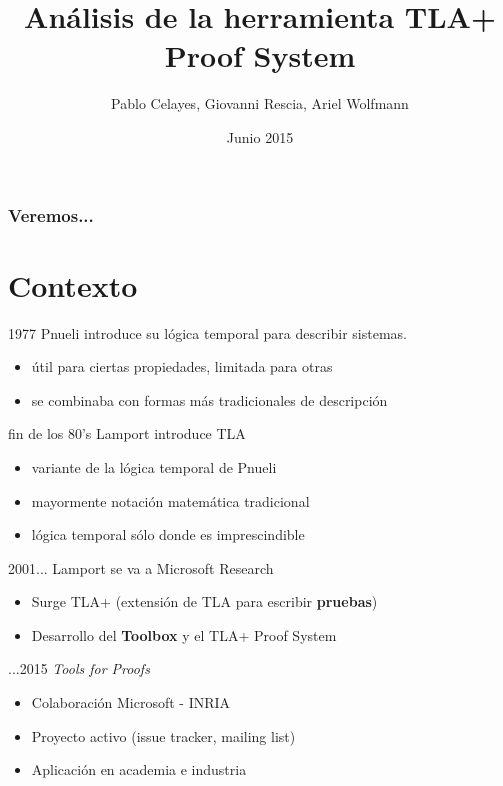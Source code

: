 \documentclass[12pt]{beamer}
\title{Análisis de la herramienta TLA+ Proof System}
\author{Pablo Celayes, Giovanni Rescia, Ariel Wolfmann}
\institute{Facultad de Matemática, Astronomía y Física\\
Universidad Nacional de Córdoba}
\date{Junio 2015}
\newenvironment{stepitemize}{\begin{itemize}[<+->]}{\end{itemize} }
\begin{document}
\begin{frame}
  \titlepage
\end{frame}

\begin{frame}
  \frametitle{Veremos...}
  \tableofcontents[pausesections]
\end{frame}


\section{Contexto}
\begin{frame}{1977}
  Pnueli introduce su lógica temporal para describir sistemas.
  \pause
  \begin{stepitemize}
    \item útil para ciertas propiedades, limitada para otras
    \item se combinaba con formas más tradicionales de descripción
  \end{stepitemize}
\end{frame}	
	
\begin{frame}{fin de los 80's}
  Lamport introduce TLA
  \pause
  \begin{stepitemize}
    \item variante de la lógica temporal de Pnueli
    \item mayormente notación matemática tradicional
    \item lógica temporal sólo donde es imprescindible  
  \end{stepitemize}
\end{frame}	

\begin{frame}{2001...}
  Lamport se va a Microsoft Research
  \pause
  \begin{stepitemize}
    \item Surge TLA+ (extensión de TLA para escribir \textbf{pruebas})
    \item Desarrollo del \textbf{Toolbox} y el {TLA+ Proof System}
  \end{stepitemize}
\end{frame}
	
\begin{frame}{...2015}
  \textit{Tools for Proofs}
  \pause
  \begin{stepitemize}
    \item Colaboración Microsoft - INRIA
    \item Proyecto activo (issue tracker, mailing list)
    \item Aplicación en academia e industria
  \end{stepitemize}
\end{frame}
\end{document}
